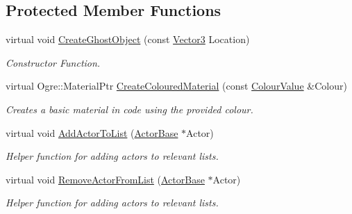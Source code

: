 \subsection*{Protected Member Functions}
\begin{DoxyCompactItemize}
\item 
virtual void \hyperlink{classphys_1_1AreaEffect_afe30d4ffa4e16dfb151446960dad61ac}{CreateGhostObject} (const \hyperlink{classphys_1_1Vector3}{Vector3} Location)
\begin{DoxyCompactList}\small\item\em Constructor Function. \item\end{DoxyCompactList}\item 
\hypertarget{classphys_1_1AreaEffect_aef2925aaa94dffb2b4d3755cfe41cb7d}{
virtual Ogre::MaterialPtr \hyperlink{classphys_1_1AreaEffect_aef2925aaa94dffb2b4d3755cfe41cb7d}{CreateColouredMaterial} (const \hyperlink{classphys_1_1ColourValue}{ColourValue} \&Colour)}
\label{d4/d55/classphys_1_1AreaEffect_aef2925aaa94dffb2b4d3755cfe41cb7d}

\begin{DoxyCompactList}\small\item\em Creates a basic material in code using the provided colour. \item\end{DoxyCompactList}\item 
\hypertarget{classphys_1_1AreaEffect_a7af039b84f8d55e2c1c2d5a1b57afd8a}{
virtual void \hyperlink{classphys_1_1AreaEffect_a7af039b84f8d55e2c1c2d5a1b57afd8a}{AddActorToList} (\hyperlink{classphys_1_1ActorBase}{ActorBase} $\ast$Actor)}
\label{d4/d55/classphys_1_1AreaEffect_a7af039b84f8d55e2c1c2d5a1b57afd8a}

\begin{DoxyCompactList}\small\item\em Helper function for adding actors to relevant lists. \item\end{DoxyCompactList}\item 
\hypertarget{classphys_1_1AreaEffect_a98bf156da3c7f8bb98d5ce9d37b6aa0f}{
virtual void \hyperlink{classphys_1_1AreaEffect_a98bf156da3c7f8bb98d5ce9d37b6aa0f}{RemoveActorFromList} (\hyperlink{classphys_1_1ActorBase}{ActorBase} $\ast$Actor)}
\label{d4/d55/classphys_1_1AreaEffect_a98bf156da3c7f8bb98d5ce9d37b6aa0f}

\begin{DoxyCompactList}\small\item\em Helper function for adding actors to relevant lists. \item\end{DoxyCompactList}\end{DoxyCompactItemize}
